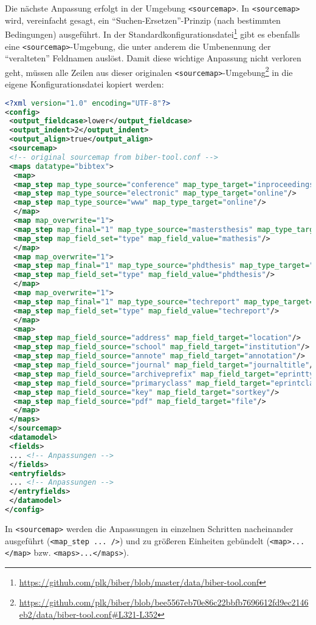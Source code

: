 \documentclass[ngerman]{dtk}
\begin{document}
Die nächste Anpassung erfolgt in der Umgebung \texttt{<sourcemap>}.
In \texttt{<sourcemap>} wird, vereinfacht gesagt, 
ein  ``Suchen-Ersetzen''-Prinzip (nach bestimmten Bedingungen) ausgeführt.
In der Standardkonfigurationsdatei\footnote{\url{https://github.com/plk/biber/blob/master/data/biber-tool.conf}} gibt es 
ebenfalls eine \texttt{<sourcemap>}-Umgebung, die unter anderem die 
Umbenennung der ``veralteten'' Feldnamen auslöst.
Damit diese wichtige Anpassung nicht verloren geht,
müssen alle Zeilen aus dieser originalen \texttt{<sourcemap>}-Umgebung\footnote{\url{https://github.com/plk/biber/blob/bee5567eb70e86c22bbfb7696612fd9ec2146eb2/data/biber-tool.conf#L321-L352}} in die
eigene Konfigurationsdatei kopiert werden:
\begin{lstlisting}[style=number,language=xml]
<?xml version="1.0" encoding="UTF-8"?>
<config>
 <output_fieldcase>lower</output_fieldcase>
 <output_indent>2</output_indent>
 <output_align>true</output_align>
 <sourcemap>
 <!-- original sourcemap from biber-tool.conf -->
 <maps datatype="bibtex">
  <map>
  <map_step map_type_source="conference" map_type_target="inproceedings"/>
  <map_step map_type_source="electronic" map_type_target="online"/>
  <map_step map_type_source="www" map_type_target="online"/>
  </map>
  <map map_overwrite="1">
  <map_step map_final="1" map_type_source="mastersthesis" map_type_target="thesis"/>
  <map_step map_field_set="type" map_field_value="mathesis"/>
  </map>
  <map map_overwrite="1">
  <map_step map_final="1" map_type_source="phdthesis" map_type_target="thesis"/>
  <map_step map_field_set="type" map_field_value="phdthesis"/>
  </map>
  <map map_overwrite="1">
  <map_step map_final="1" map_type_source="techreport" map_type_target="report"/>
  <map_step map_field_set="type" map_field_value="techreport"/>
  </map>
  <map>
  <map_step map_field_source="address" map_field_target="location"/>
  <map_step map_field_source="school" map_field_target="institution"/>
  <map_step map_field_source="annote" map_field_target="annotation"/>
  <map_step map_field_source="journal" map_field_target="journaltitle"/>
  <map_step map_field_source="archiveprefix" map_field_target="eprinttype"/>
  <map_step map_field_source="primaryclass" map_field_target="eprintclass"/>
  <map_step map_field_source="key" map_field_target="sortkey"/>
  <map_step map_field_source="pdf" map_field_target="file"/>
  </map>
 </maps>
 </sourcemap>
 <datamodel>
 <fields>
 ... <!-- Anpassungen -->
 </fields>
 <entryfields>
 ... <!-- Anpassungen -->
 </entryfields>
 </datamodel>
</config>
\end{lstlisting}
In \texttt{<sourcemap>} werden die Anpassungen 
in einzelnen Schritten nacheinander ausgeführt (\texttt{<map\_step ... />}) und
zu größeren Einheiten gebündelt (\texttt{<map>...</map>} bzw. \texttt{<maps>...</maps>}).
\end{document}

